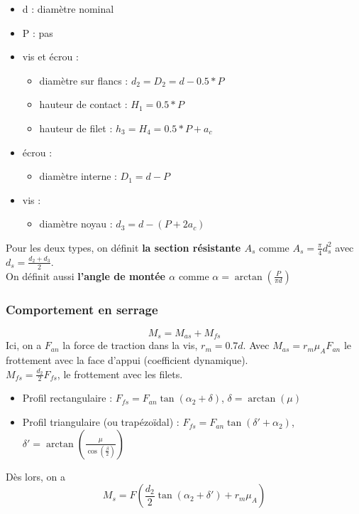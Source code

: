 \documentclass[../main.tex]{subfiles}
\begin{document}
\begin{itemize}
    \item d : diamètre nominal\\
    \item P : pas\\
    \item vis et écrou : \begin{itemize}
        \item diamètre sur flancs : $d_2 = D_2 = d-0.5*P$\\
        \item hauteur de contact : $H_1 = 0.5*P$\\
        \item hauteur de filet : $h_3 = H_4 = 0.5*P+a_c$\\
    \end{itemize}
    \item écrou : \begin{itemize}
        \item diamètre interne : $D_1 = d-P$\\
    \end{itemize}
    \item vis : \begin{itemize}
        \item diamètre noyau : $d_3 = d-(P+2a_c)$\\
    \end{itemize}
\end{itemize}

Pour les deux types, on définit \textbf{la section résistante $A_s$} comme $A_s = \frac{\pi}{4} d_s^2$ avec $d_s = \frac{d_2+d_3}{2}$. \\
On définit aussi \textbf{l'angle de montée $\alpha$} comme $\alpha = \arctan(\frac{P}{\pi d})$\\

\subsubsection{Comportement en serrage}
\begin{equation}
    M_s = M_{as}+M_{fs}
\end{equation}
Ici, on a $F_{an}$ la force de traction dans la vis, $r_m = 0.7d$. 
Avec $M_{as} = r_m \mu_A F_{an}$ le frottement avec la face d'appui (coefficient dynamique).\\
$M_{fs} = \frac{d_2}{2}F_{fs}$, le frottement avec les filets.
\begin{itemize}
    \item Profil rectangulaire : $F_{fs} = F_{an} \tan(\alpha_2 + \delta)$, $\delta = \arctan(\mu)$\\
    \item Profil triangulaire (ou trapézoïdal) : $F_{fs} = F_{an} \tan(\delta'+\alpha_2)$, $\delta' = \arctan(\frac{\mu}{\cos(\frac{\beta}{2})})$\\
\end{itemize}
Dès lors, on a \\
\begin{equation}
    M_s = F(\frac{d_2}{2} \tan(\alpha_2 + \delta') + r_m \mu_A)
\end{equation}
\end{document}
